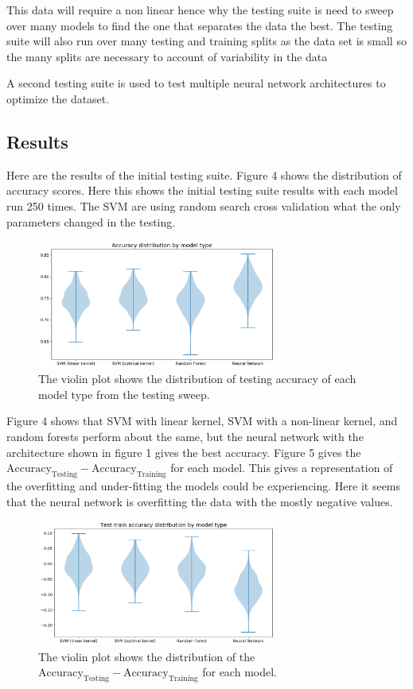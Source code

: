 \documentclass[12pt]{article}
\begin{document}
This data will require a non linear hence why the testing suite is need to sweep over many models to find the one that separates the data the best.  The testing suite will also run over many testing and training splits as the data set is small so the many splits are necessary to account of variability in the data

A second testing suite is used to test multiple neural network architectures to optimize the dataset.  

\subsection{Results}

Here are the results of the initial testing suite. Figure 4 shows the distribution of accuracy scores.  Here this shows the initial testing suite results with each model run 250 times.  The SVM are using random search cross validation what the only parameters changed in the testing.  

 \begin{figure}[H]
 \centering
  \includegraphics[width=0.7\textwidth]{testOut}
  \caption{The violin plot shows the distribution of testing accuracy of each model type from the testing sweep.}
  \end{figure}
  
  Figure 4 shows that SVM with linear kernel, SVM with a non-linear kernel, and random forests perform about the same, but the neural network with the architecture shown in figure 1 gives the best accuracy. Figure 5 gives the  $\text{Accuracy}_{\text{Testing}} - \text{Accuracy}_{\text{Training}}$ for each model.  This gives a representation of the overfitting and under-fitting the models could be experiencing.  Here it seems that the neural network is overfitting the data with the mostly negative values.
 
   \begin{figure}[H]
 \centering
  \includegraphics[width=0.7\textwidth]{testOut2}
  \caption{The violin plot shows the distribution of the $\text{Accuracy}_{\text{Testing}} - \text{Accuracy}_{\text{Training}}$
for each model.  }
  \end{figure}
  
\end{document}
